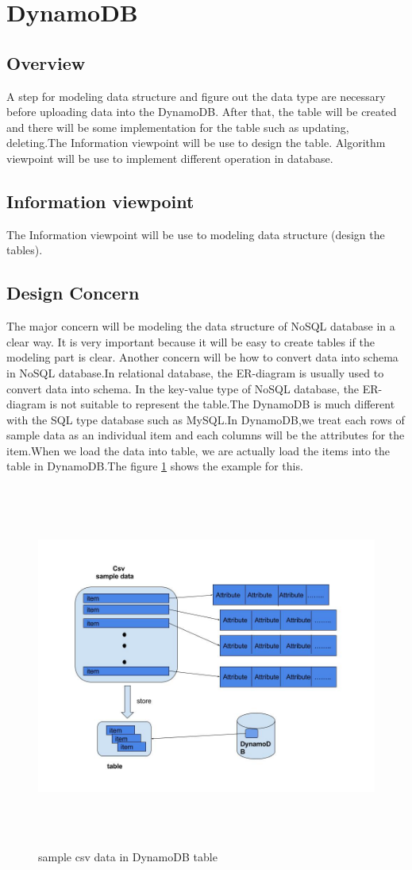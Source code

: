 \section{DynamoDB}
    \subsection{Overview}
    A step for modeling data structure and figure out the data type are necessary before uploading data into the DynamoDB. After that, the table will be created and there will be some implementation for the table such as updating, deleting.The Information viewpoint will be use to design the table. Algorithm viewpoint will be use to implement different operation in database.    
    \subsection{Information viewpoint}
    The Information viewpoint will be use to modeling data structure (design the tables).
	\subsection{ Design Concern}
	The major concern will be modeling the data structure of NoSQL database in a clear way. It is very important because it will be easy to create tables if the modeling part is clear. Another concern will be how to convert data into schema in NoSQL database.In relational database, the ER-diagram is usually used to convert data into schema. In the key-value type of NoSQL database, the ER-diagram is not suitable to represent the table.The DynamoDB is much different with the SQL type database such as MySQL.In DynamoDB,we treat each rows of sample data as an individual item and each columns will be the attributes for the item.When we load the data into table, we are actually load the items into the table in DynamoDB.The figure \ref{fig:1} shows the example for this.
\begin{figure}[H]
 \includegraphics[width=15cm, height=12cm]{11.jpg}
 \centering
 \caption{\label{fig:1}sample csv data in DynamoDB table}
 \end{figure}


